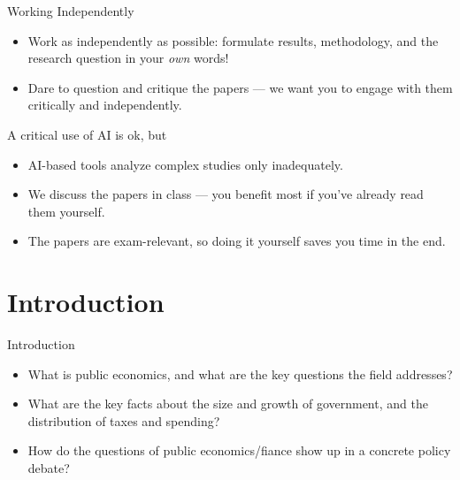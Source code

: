 \documentclass[11pt,aspectratio=169]{beamer}
\begin{document}
	\begin{frame}{Working Independently}
		\begin{itemize}
			\item Work as independently as possible: formulate results, methodology, and the research question in your \emph{own} words!
			\item Dare to question and critique the papers --- we want you to engage with them critically and independently.
		\end{itemize}
		\begin{alertblock}{A critical use of AI is ok, but}
			\begin{itemize}
				\item AI-based tools analyze complex studies only inadequately.
				\item We discuss the papers in class --- you benefit most if you've already read them yourself.
				\item The papers are  exam-relevant, so doing it yourself saves you time in the end.
			\end{itemize}
		\end{alertblock}
	\end{frame}




\section{Introduction}
\begin{frame}{Introduction}
  \begin{itemize}
    \item What is \alert{public economics}, and what are the key questions the field addresses?
    \item What are the key facts about the size and growth of government, and the distribution of taxes and spending?
    \item How do the questions of public economics/fiance show up in a concrete policy debate?  
  \end{itemize}
  \vspace{1em}

\end{frame}

 

 
\end{document}
